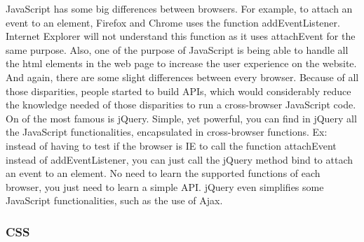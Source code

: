 JavaScript has some big differences between browsers. For example, to attach an event to an element, Firefox and Chrome uses the function addEventListener. Internet Explorer will not understand this function as it uses attachEvent for the same purpose. %
Also, one of the purpose of JavaScript is being able to handle all the html elements in the web page to increase the user experience on the website. And again, there are some slight differences between every browser.
Because of all those disparities, people started to build APIs, which would considerably reduce the knowledge needed of those disparities to run a cross-browser JavaScript code. On of the most famous is jQuery. Simple, yet powerful, you can find in jQuery all the JavaScript functionalities, encapsulated in cross-browser functions. Ex: instead of having to test if the browser is IE to call the function attachEvent instead of addEventListener, you can just call the jQuery method bind to attach an event to an element. No need to learn the supported functions of each browser, you just need to learn a simple API. jQuery even simplifies some JavaScript functionalities, such as the use of Ajax.

\subsubsection{CSS}

